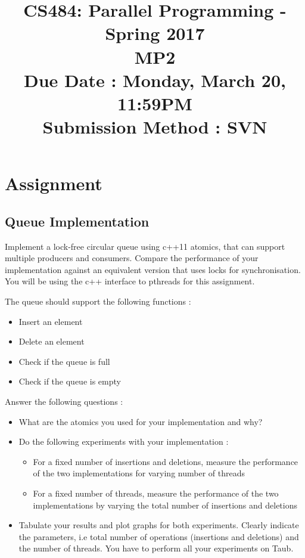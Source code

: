 \documentclass[12pt]{article}
\begin{document}
\title{CS484: Parallel Programming - Spring 2017 \\
MP2 \\
Due Date : Monday, March 20, 11:59PM \\
Submission Method : SVN}

\maketitle

\section {Assignment}

\subsection{Queue Implementation}

Implement a lock-free circular queue using c++11 atomics, that can support multiple producers and consumers.
Compare the performance of your implementation against an equivalent version that
uses locks for synchronisation. You will be using the c++ interface to pthreads for this assignment.

The queue should support the following functions :

\begin{itemize}
\item Insert an element
\item Delete an element
\item Check if the queue is full
\item Check if the queue is empty
\end{itemize}	


Answer the following questions :

\begin{itemize}
\item What are the atomics you used for your implementation and why?
\item Do the following experiments with your implementation :
  \begin{itemize}
  \item For a fixed number of insertions and deletions, measure the performance of the two implementations for varying number of threads
 \item For a fixed number of threads, measure the performance of the two implementations by varying the total number of insertions and deletions
  \end{itemize}

\item Tabulate your results and plot graphs for both experiments. Clearly indicate the parameters, i.e total number of operations (insertions and deletions) and the number of threads.
You have to perform all your experiments on Taub.
\end{itemize}
\end{document}
